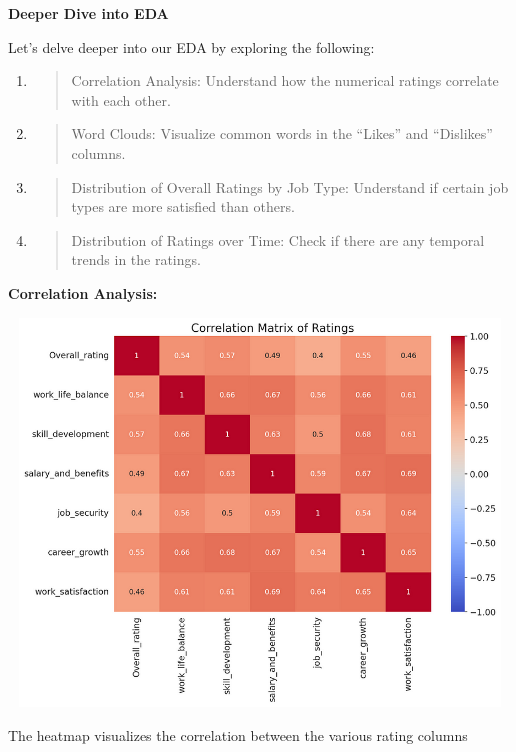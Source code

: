 \documentclass[
]{article}
\newcommand{\textcenter}[1]{\begin{center} \vspace{10px}\textbf{\large #1} \end{center}}
\begin{document}
\textcenter{Deeper Dive into EDA}

Let's delve deeper into our EDA by exploring the following:

\begin{enumerate}
\def\labelenumi{\arabic{enumi}.}
\item
  \begin{quote}
  Correlation Analysis: Understand how the numerical ratings correlate
  with each other.
  \end{quote}
\item
  \begin{quote}
  Word Clouds: Visualize common words in the ``Likes'' and ``Dislikes''
  columns.
  \end{quote}
\item
  \begin{quote}
  Distribution of Overall Ratings by Job Type: Understand if certain job
  types are more satisfied than others.
  \end{quote}
\item
  \begin{quote}
  Distribution of Ratings over Time: Check if there are any temporal
  trends in the ratings.
  \end{quote}
\end{enumerate}

\textbf{Correlation Analysis:}

\includegraphics[width=5.26806in,height=4.05764in]{image5.png}

The heatmap visualizes the correlation between the various rating
columns
\end{document}
